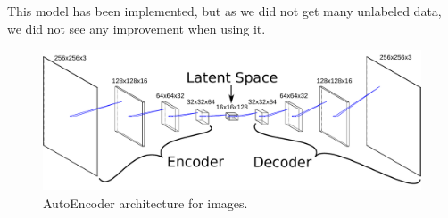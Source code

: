 This model has been implemented, but as we did not get many unlabeled data, we did not see any improvement when using it.

\begin{figure}
    \centering
    \includegraphics[width=1\linewidth]{figures/models/AutoEncoder.pdf}
    \caption[AutoEncoder]{AutoEncoder architecture\footnotemark{} for images.}
    \label{fig:autoencoder_schema}
\end{figure}

